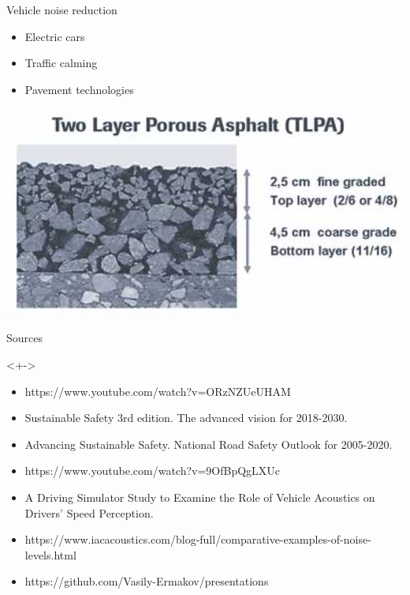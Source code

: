 \documentclass{beamer}
\begin{document}
    \begin{frame}{Vehicle noise reduction}
        \begin{block}{}
            \begin{itemize}
                \item Electric cars
                \item Traffic calming
                \item Pavement technologies
            \end{itemize}
            \includegraphics[width = \textwidth]{Porous asphalt.PNG}
        \end{block}

    \end{frame}

    \begin{frame}{Sources}
        \begin{block}
            <+->{}
            \begin{itemize}
                \item https://www.youtube.com/watch?v=ORzNZUeUHAM
                \item Sustainable Safety 3rd edition. The advanced vision for 2018-2030.
                \item Advancing Sustainable Safety. National Road Safety Outlook for 2005-2020.
                \item https://www.youtube.com/watch?v=9OfBpQgLXUc
                \item A Driving Simulator Study to Examine the Role of Vehicle Acoustics on Drivers’ Speed Perception.
                \item https://www.iacacoustics.com/blog-full/comparative-examples-of-noise-levels.html
                \item https://github.com/Vasily-Ermakov/presentations
            \end{itemize}
        \end{block}
    \end{frame}
\end{document}
